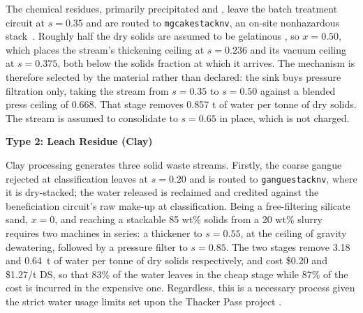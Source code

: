 \documentclass{article}
\renewcommand\_{\textunderscore\allowbreak}
\begin{document}
The chemical residues, primarily precipitated  and , leave the batch treatment circuit at $s = 0.35$ and are routed to \texttt{mgcake\_stack\_nv\_35}, an on-site nonhazardous stack~\cite{srkconsultingSECTechnicalReport2023a}. Roughly half the dry solids are assumed to be gelatinous , so $x = 0.50$, which places the stream's thickening ceiling at $s = 0.236$ and its vacuum ceiling at $s = 0.375$, both below the solids fraction at which it arrives. The mechanism is therefore selected by the material rather than declared: the sink buys pressure filtration only, taking the stream from $s = 0.35$ to $s = 0.50$ against a blended press ceiling of 0.668. That stage removes 0.857 t of water per tonne of dry solids. The stream is assumed to consolidate to $s = 0.65$ in place, which is not charged.

\medskip
\noindent\textbf{Type 2: Leach Residue (Clay)}\quad

Clay processing generates three solid waste streams. Firstly, the coarse gangue rejected at classification leaves at $s = 0.20$ and is routed to \texttt{gangue\_stack\_nv\_20}, where it is dry-stacked; the water released is reclaimed and credited against the beneficiation circuit's raw make-up at classification. Being a free-filtering silicate sand, $x = 0$, and reaching a stackable 85 wt\% solids from a 20 wt\% slurry requires two machines in series: a thickener to $s = 0.55$, at the ceiling of gravity dewatering, followed by a pressure filter to $s = 0.85$. The two stages remove 3.18 and 0.64~t of water per tonne of dry solids respectively, and cost \$0.20 and \$1.27/t DS, so that 83\% of the water leaves in the cheap stage while 87\% of the cost is incurred in the expensive one. Regardless, this is a necessary process given the strict water usage limits set upon the Thacker Pass project \cite{lithiumnevadacorp.FactSheetThacker2022}. 
\end{document}
